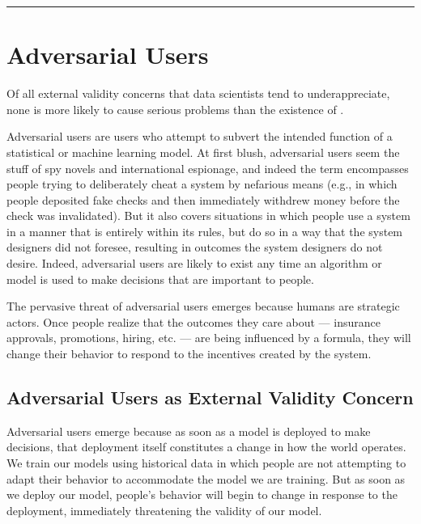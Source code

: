 \documentclass[letterpaper,10pt,english]{jupyterBook}
\begin{document}
\bigskip\hrule\bigskip


\sphinxstepscope


\section{Adversarial Users}
\label{\detokenize{30_questions/28_passive_external_adversarial_users:adversarial-users}}\label{\detokenize{30_questions/28_passive_external_adversarial_users::doc}}
\sphinxAtStartPar
Of all external validity concerns that data scientists tend to underappreciate, none is more likely to cause serious problems than the existence of .

\sphinxAtStartPar
Adversarial users are users who attempt to subvert the intended function of a statistical or machine learning model. At first blush, adversarial users seem the stuff of spy novels and international espionage, and indeed the term encompasses people trying to deliberately cheat a system by nefarious means (e.g.,  in which people deposited fake checks and then immediately withdrew money before the check was invalidated). But it also covers situations in which people use a system in a manner that is entirely within its rules, but do so in a way that the system designers did not foresee, resulting in outcomes the system designers do not desire. Indeed, adversarial users are likely to exist any time an algorithm or model is used to make decisions that are important to people.

\sphinxAtStartPar
The pervasive threat of adversarial users emerges because humans are strategic actors. Once people realize that the outcomes they care about — insurance approvals, promotions, hiring, etc. — are being influenced by a formula, they will change their behavior to respond to the incentives created by the system.


\subsection{Adversarial Users as External Validity Concern}
\label{\detokenize{30_questions/28_passive_external_adversarial_users:adversarial-users-as-external-validity-concern}}
\sphinxAtStartPar
Adversarial users emerge because as soon as a model is deployed to make decisions, that deployment itself constitutes a change in how the world operates. We train our models using historical data in which people are not attempting to adapt their behavior to accommodate the model we are training. But as soon as we deploy our model, people’s behavior will begin to change in response to the deployment, immediately threatening the validity of our model.
\end{document}
